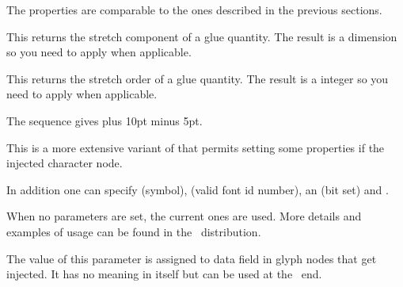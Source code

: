 The properties are comparable to the ones described in the previous sections.

\stopnewprimitive

\startoldprimitive[title={\prm {gluestretch}}]

This returns the stretch component of a glue quantity. The result is a dimension
so you need to apply  when applicable.

\stopoldprimitive

\startoldprimitive[title={\prm {gluestretchorder}}]

This returns the stretch order of a glue quantity. The result is a integer so you
need to apply  when applicable.

\stopoldprimitive

\startoldprimitive[title={\prm {gluetomu}}]

The sequence  gives \the \gluetomu
20pt plus 10pt minus 5pt.

\stopoldprimitive

\startnewprimitive[title={\prm {glyph}}]

This is a more extensive variant of  that permits setting some
properties if the injected character node.

\startbuffer
{}
\quad
{}
\stopbuffer

\typebuffer

In addition one can specify  (symbol),  (valid font id
number), an  (bit set) and .

\startlinecorrection
\dontleavehmode\getbuffer
\stoplinecorrection

When no parameters are set, the current ones are used. More details and examples
of usage can be found in the \CONTEXT\ distribution.

\stopnewprimitive

\startnewprimitive[title={\prm {glyphdatafield}}]

The value of this parameter is assigned to data field in glyph nodes that get
injected. It has no meaning in itself but can be used at the \LUA\ end.

\stopnewprimitive

\startnewprimitive[title={\prm {glyphoptions}}]

